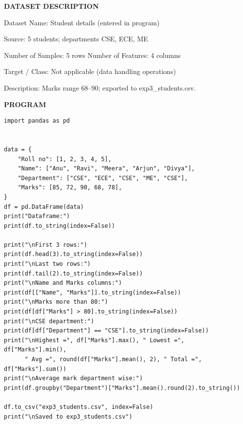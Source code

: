 \documentclass[11pt,twoside]{article}
\newcommand{\expheading}[1]{{\fontsize{14}{17}\selectfont\textbf{#1}\par}}
\newcommand{\toevenpage}{\clearpage\ifodd\value{page}\null\thispagestyle{empty}\newpage\fi}
\begin{document}
{\expheading{DATASET DESCRIPTION}
\vspace{4pt}
\noindent Dataset Name: Student details (entered in program)\par
\noindent Source: 5 students; departments CSE, ECE, ME\par
\noindent Number of Samples: 5 rows \hspace{0.3cm} Number of Features: 4 columns\par
\noindent Target / Class: Not applicable (data handling operations)\par
\noindent Description: Marks range 68--90; exported to exp3\_students.csv. \par
\vspace{4pt}
} %

\toevenpage
\expheading{PROGRAM}
\vspace{6pt}

\begin{lstlisting}
import pandas as pd


data = {
    "Roll no": [1, 2, 3, 4, 5],
    "Name": ["Anu", "Ravi", "Meera", "Arjun", "Divya"],
    "Department": ["CSE", "ECE", "CSE", "ME", "CSE"],
    "Marks": [85, 72, 90, 68, 78],
}
df = pd.DataFrame(data)
print("Dataframe:")
print(df.to_string(index=False))

print("\nFirst 3 rows:")
print(df.head(3).to_string(index=False))
print("\nLast two rows:")
print(df.tail(2).to_string(index=False))
print("\nName and Marks columns:")
print(df[["Name", "Marks"]].to_string(index=False))
print("\nMarks more than 80:")
print(df[df["Marks"] > 80].to_string(index=False))
print("\nCSE department:")
print(df[df["Department"] == "CSE"].to_string(index=False))
print("\nHighest =", df["Marks"].max(), " Lowest =", df["Marks"].min(),
      " Avg =", round(df["Marks"].mean(), 2), " Total =", df["Marks"].sum())
print("\nAverage mark department wise:")
print(df.groupby("Department")["Marks"].mean().round(2).to_string())

df.to_csv("exp3_students.csv", index=False)
print("\nSaved to exp3_students.csv")
\end{lstlisting}
\end{document}
